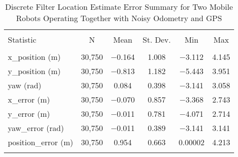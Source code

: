 
\begin{table}[htbp] \centering 
  \caption{Discrete Filter Location Estimate Error Summary for Two Mobile Robots Operating Together with Noisy Odometry and GPS} 
  \label{tab:two_mobile_discrete_summary} 
\begin{tabular}{@{\extracolsep{5pt}}lccccc} 
\\[-1.8ex]\hline 
\hline \\[-1.8ex] 
Statistic & \multicolumn{1}{c}{N} & \multicolumn{1}{c}{Mean} & \multicolumn{1}{c}{St. Dev.} & \multicolumn{1}{c}{Min} & \multicolumn{1}{c}{Max} \\ 
\hline \\[-1.8ex] 
x\_position (m) & 30,750 & $-$0.164 & \num{1.008} & $-$3.112 & \num{4.145} \\ 
y\_position (m) & 30,750 & $-$0.813 & \num{1.182} & $-$5.443 & \num{3.951} \\ 
yaw (rad) & 30,750 & \num{0.084} & \num{0.398} & $-$3.141 & \num{3.058} \\ 
x\_error (m) & 30,750 & $-$0.070 & \num{0.857} & $-$3.368 & \num{2.743} \\ 
y\_error (m) & 30,750 & $-$0.011 & \num{0.781} & $-$4.071 & \num{2.714} \\ 
yaw\_error (rad) & 30,750 & $-$0.011 & \num{0.389} & $-$3.141 & \num{3.141} \\ 
position\_error (m) & 30,750 & \num{0.954} & \num{0.663} & \num{0.00002} & \num{4.213} \\ 
\hline \\[-1.8ex] 
\end{tabular} 
\end{table} 
